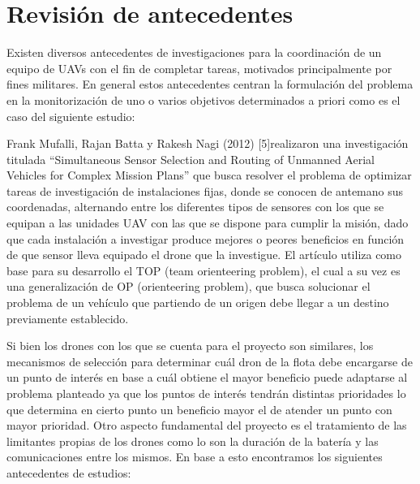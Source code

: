 \chapter{Revisión de antecedentes}

Existen diversos antecedentes de investigaciones para la coordinación de un equipo de UAVs con el fin de completar tareas, motivados principalmente por fines militares.  En general estos antecedentes centran la formulación del problema en la monitorización de uno o varios objetivos determinados a priori como es el caso del siguiente estudio:

Frank Mufalli, Rajan Batta y Rakesh Nagi (2012)  [5]realizaron una investigación titulada “Simultaneous Sensor Selection and Routing of Unmanned Aerial Vehicles for Complex Mission Plans” que busca resolver el problema de optimizar tareas de investigación de instalaciones fijas, donde se conocen de antemano sus coordenadas, alternando entre los diferentes tipos de sensores con los que se equipan a las unidades UAV con las que se dispone para cumplir la misión, dado que cada instalación a investigar produce mejores o peores beneficios en función de que sensor lleva equipado el drone que la investigue.
El artículo utiliza como base para su desarrollo el TOP (team orienteering problem), el cual a su vez es una generalización de OP (orienteering  problem), que busca solucionar el problema de un vehículo que partiendo de un origen debe llegar a un destino previamente establecido.

Si bien los drones con los que se cuenta para el proyecto son similares, los mecanismos de selección para determinar cuál dron de la flota debe encargarse de un punto de interés en base a cuál obtiene el mayor beneficio puede adaptarse al problema planteado ya que los puntos de interés tendrán distintas prioridades lo que determina en cierto punto un beneficio mayor el de atender un punto con mayor prioridad.
Otro aspecto fundamental del proyecto es el tratamiento de las limitantes propias de los drones como lo son la duración de la batería y las comunicaciones entre los mismos. En base a esto encontramos los siguientes antecedentes de estudios: 

